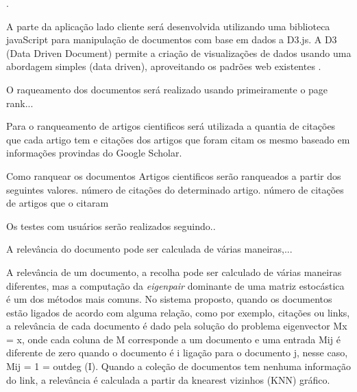 . 

A parte da aplicação lado cliente será desenvolvida utilizando uma biblioteca javaScript para manipulação de documentos com base em dados a D3.js. A D3 (Data Driven Document) permite a criação de visualizações de dados usando uma abordagem simples (data driven), aproveitando os padrões web existentes \cite{zhu2013data}.

O raqueamento dos documentos será realizado usando primeiramente o page rank...

Para o ranqueamento de artigos cientificos será utilizada a quantia de citações que cada artigo tem e citações dos artigos que foram citam os mesmo baseado em informações provindas do Google Scholar.
 
Como ranquear os documentos
Artigos cientificos serão ranqueados a partir dos seguintes valores.
número de citações do determinado artigo.
número de citações de artigos que o citaram



Os testes com usuários serão realizados seguindo..


A relevância do documento pode ser calculada de várias maneiras,... 

A relevância de um documento, a recolha pode ser calculado de várias maneiras diferentes, mas a computação da \textit{eigenpair} dominante de uma matriz estocástica é um dos métodos mais comuns. No sistema proposto, quando os documentos estão ligados de acordo com alguma relação, como por exemplo, citações ou links, a relevância de cada documento é dado pela solução do problema eigenvector Mx = x, onde cada coluna de M corresponde a um documento e uma entrada Mij é diferente de zero quando o documento é i ligação para o documento j, nesse caso, Mij = 1 = outdeg (I). Quando a coleção de documentos tem nenhuma informação do link, a relevância é calculada a partir da knearest vizinhos (KNN) gráfico.
